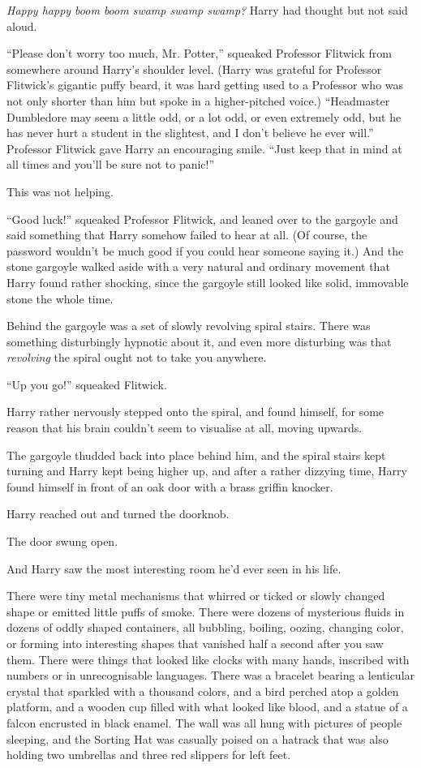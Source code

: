\emph{Happy happy boom boom swamp swamp swamp?} Harry had thought but
not said aloud.

``Please don't worry too much, Mr. Potter,'' squeaked Professor Flitwick
from somewhere around Harry's shoulder level. (Harry was grateful for
Professor Flitwick's gigantic puffy beard, it was hard getting used to a
Professor who was not only shorter than him but spoke in a
higher-pitched voice.) ``Headmaster Dumbledore may seem a little odd, or
a lot odd, or even extremely odd, but he has never hurt a student in the
slightest, and I don't believe he ever will.'' Professor Flitwick gave
Harry an encouraging smile. ``Just keep that in mind at all times and
you'll be sure not to panic!''

This was not helping.

``Good luck!'' squeaked Professor Flitwick, and leaned over to the
gargoyle and said something that Harry somehow failed to hear at all.
(Of course, the password wouldn't be much good if you could hear someone
saying it.) And the stone gargoyle walked aside with a very natural and
ordinary movement that Harry found rather shocking, since the gargoyle
still looked like solid, immovable stone the whole time.

Behind the gargoyle was a set of slowly revolving spiral stairs. There
was something disturbingly hypnotic about it, and even more disturbing
was that \emph{revolving} the spiral ought not to take you anywhere.

``Up you go!'' squeaked Flitwick.

Harry rather nervously stepped onto the spiral, and found himself, for
some reason that his brain couldn't seem to visualise at all, moving
upwards.

The gargoyle thudded back into place behind him, and the spiral stairs
kept turning and Harry kept being higher up, and after a rather dizzying
time, Harry found himself in front of an oak door with a brass griffin
knocker.

Harry reached out and turned the doorknob.

The door swung open.

And Harry saw the most interesting room he'd ever seen in his life.

There were tiny metal mechanisms that whirred or ticked or slowly
changed shape or emitted little puffs of smoke. There were dozens of
mysterious fluids in dozens of oddly shaped containers, all bubbling,
boiling, oozing, changing color, or forming into interesting shapes that
vanished half a second after you saw them. There were things that looked
like clocks with many hands, inscribed with numbers or in unrecognisable
languages. There was a bracelet bearing a lenticular crystal that
sparkled with a thousand colors, and a bird perched atop a golden
platform, and a wooden cup filled with what looked like blood, and a
statue of a falcon encrusted in black enamel. The wall was all hung with
pictures of people sleeping, and the Sorting Hat was casually poised on
a hatrack that was also holding two umbrellas and three red slippers for
left feet.

